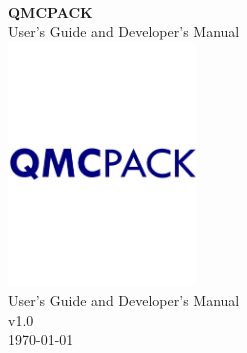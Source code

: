 
  \begin{center}
\HRule\\[0.5 cm]
{\huge \bfseries QMCPACK \\[0.5cm]}
{\large User's Guide and Developer's Manual\\[1cm]}
\HRule
\includegraphics[width=5cm]{figures/QMCPACK_logo.pdf}\\
{\huge User's Guide and Developer's Manual \\}
{\huge v1.0\\ \today}

  \end{center}
